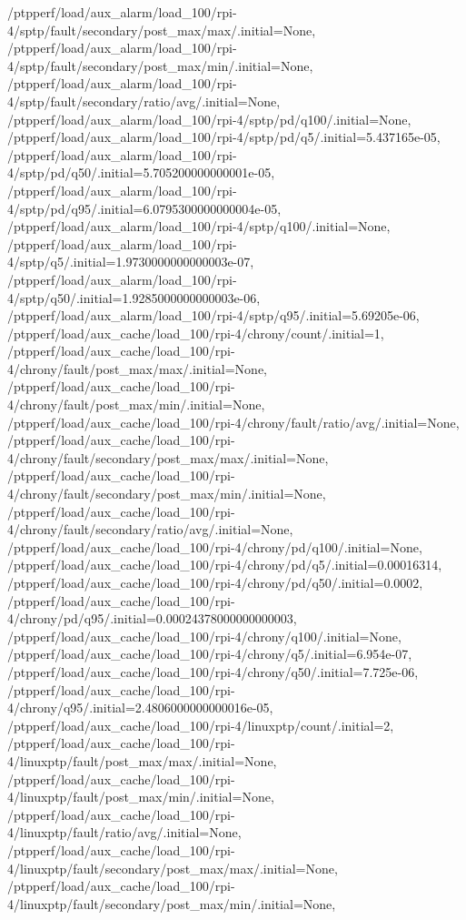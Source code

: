 {    /ptpperf/load/aux_alarm/load_100/rpi-4/sptp/fault/secondary/post_max/max/.initial=None,
    /ptpperf/load/aux_alarm/load_100/rpi-4/sptp/fault/secondary/post_max/min/.initial=None,
    /ptpperf/load/aux_alarm/load_100/rpi-4/sptp/fault/secondary/ratio/avg/.initial=None,
    /ptpperf/load/aux_alarm/load_100/rpi-4/sptp/pd/q100/.initial=None,
    /ptpperf/load/aux_alarm/load_100/rpi-4/sptp/pd/q5/.initial=5.437165e-05,
    /ptpperf/load/aux_alarm/load_100/rpi-4/sptp/pd/q50/.initial=5.705200000000001e-05,
    /ptpperf/load/aux_alarm/load_100/rpi-4/sptp/pd/q95/.initial=6.0795300000000004e-05,
    /ptpperf/load/aux_alarm/load_100/rpi-4/sptp/q100/.initial=None,
    /ptpperf/load/aux_alarm/load_100/rpi-4/sptp/q5/.initial=1.9730000000000003e-07,
    /ptpperf/load/aux_alarm/load_100/rpi-4/sptp/q50/.initial=1.9285000000000003e-06,
    /ptpperf/load/aux_alarm/load_100/rpi-4/sptp/q95/.initial=5.69205e-06,
    /ptpperf/load/aux_cache/load_100/rpi-4/chrony/count/.initial=1,
    /ptpperf/load/aux_cache/load_100/rpi-4/chrony/fault/post_max/max/.initial=None,
    /ptpperf/load/aux_cache/load_100/rpi-4/chrony/fault/post_max/min/.initial=None,
    /ptpperf/load/aux_cache/load_100/rpi-4/chrony/fault/ratio/avg/.initial=None,
    /ptpperf/load/aux_cache/load_100/rpi-4/chrony/fault/secondary/post_max/max/.initial=None,
    /ptpperf/load/aux_cache/load_100/rpi-4/chrony/fault/secondary/post_max/min/.initial=None,
    /ptpperf/load/aux_cache/load_100/rpi-4/chrony/fault/secondary/ratio/avg/.initial=None,
    /ptpperf/load/aux_cache/load_100/rpi-4/chrony/pd/q100/.initial=None,
    /ptpperf/load/aux_cache/load_100/rpi-4/chrony/pd/q5/.initial=0.00016314,
    /ptpperf/load/aux_cache/load_100/rpi-4/chrony/pd/q50/.initial=0.0002,
    /ptpperf/load/aux_cache/load_100/rpi-4/chrony/pd/q95/.initial=0.00024378000000000003,
    /ptpperf/load/aux_cache/load_100/rpi-4/chrony/q100/.initial=None,
    /ptpperf/load/aux_cache/load_100/rpi-4/chrony/q5/.initial=6.954e-07,
    /ptpperf/load/aux_cache/load_100/rpi-4/chrony/q50/.initial=7.725e-06,
    /ptpperf/load/aux_cache/load_100/rpi-4/chrony/q95/.initial=2.4806000000000016e-05,
    /ptpperf/load/aux_cache/load_100/rpi-4/linuxptp/count/.initial=2,
    /ptpperf/load/aux_cache/load_100/rpi-4/linuxptp/fault/post_max/max/.initial=None,
    /ptpperf/load/aux_cache/load_100/rpi-4/linuxptp/fault/post_max/min/.initial=None,
    /ptpperf/load/aux_cache/load_100/rpi-4/linuxptp/fault/ratio/avg/.initial=None,
    /ptpperf/load/aux_cache/load_100/rpi-4/linuxptp/fault/secondary/post_max/max/.initial=None,
    /ptpperf/load/aux_cache/load_100/rpi-4/linuxptp/fault/secondary/post_max/min/.initial=None,
}

